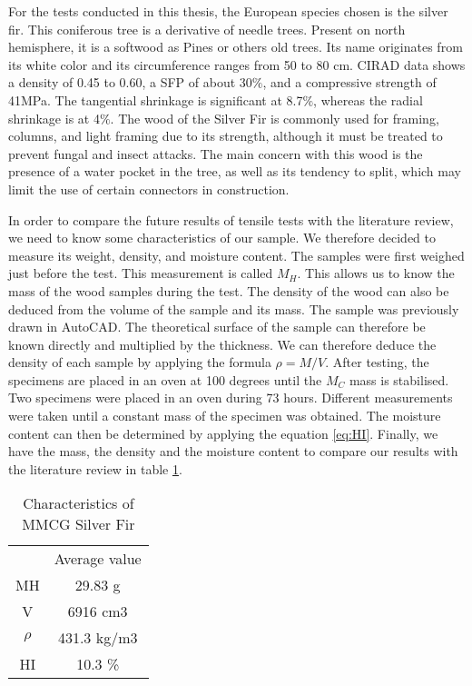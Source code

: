 For the tests conducted in this thesis, the European species chosen is the silver fir. This coniferous tree is a derivative of needle trees.  Present on north hemisphere, it is a softwood as Pines or others old trees. Its name originates from its white color and its circumference ranges from 50 to 80 cm. CIRAD data shows a density of 0.45 to 0.60, a SFP of about 30$\%$, and a compressive strength of 41MPa. The tangential shrinkage is significant at 8.7$\%$, whereas the radial shrinkage is at 4$\%$. The wood of the Silver Fir is commonly used for framing, columns, and light framing due to its strength, although it must be treated to prevent fungal and insect attacks. The main concern with this wood is the presence of a water pocket in the tree, as well as its tendency to split, which may limit the use of certain connectors in construction.

In order to compare the future results of tensile tests with the literature review, we need to know some characteristics of our sample.
We therefore decided to measure its weight, density, and moisture content.
The samples were first weighed just before the test. This measurement is called $M_H$. 
This allows us to know the mass of the wood samples during the test.
The density of the wood can also be deduced from the volume of the sample and its mass.
The sample was previously drawn in AutoCAD. The theoretical surface of the sample can therefore be known directly and multiplied by the thickness.
We can therefore deduce the density of each sample by applying the formula $\rho=M/V$.
After testing, the specimens are placed in an oven at 100 degrees until the $M_C$ mass is stabilised. Two specimens were placed in an oven during 73 hours. Different measurements were taken until a constant mass of the specimen was obtained.
The moisture content can then be determined by applying the equation \ref{eq:HI}.
Finally, we have the mass, the density and the moisture content to compare our results with the literature review in table \ref{tab:Tabmean}.

\begin{table}[h]
	\centering
	\begin{tabular}{c c }
		\multicolumn{1}{l}{} & \multicolumn{1}{l}{Average value} \\
		\multicolumn{1}{c}{\cellcolor[HTML]{F8CBAD}MH} & 29.83   g \\
		\multicolumn{1}{c}{\cellcolor[HTML]{F8CBAD}V} & 6916 cm3 \\
		\multicolumn{1}{c}{\cellcolor[HTML]{F8CBAD}$\rho$} & 431.3 kg/m3 \\
		\multicolumn{1}{c}{\cellcolor[HTML]{F8CBAD}HI} & 10.3 \% \\
	\end{tabular}
	\caption{Characteristics of MMCG Silver Fir}
	\label{tab:Tabmean}
\end{table}

